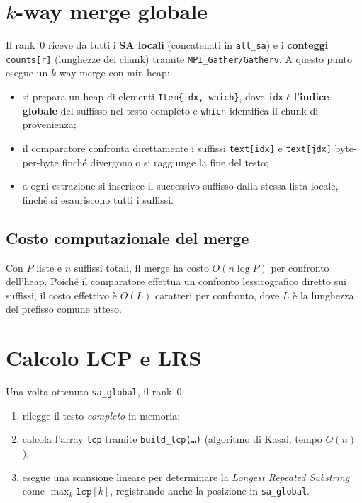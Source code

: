 	\section{$k$-way merge globale}
		Il rank~0 riceve da tutti i \textbf{SA locali} (concatenati in \texttt{all\_sa}) e i \textbf{conteggi} \texttt{counts[r]} (lunghezze dei chunk) tramite \texttt{MPI\_Gather/Gatherv}.
		A questo punto esegue un $k$-way merge con min-heap:
		\begin{itemize}
			\item si prepara un heap di elementi \texttt{Item\{idx, which\}}, dove \texttt{idx} è l'\textbf{indice globale} del suffisso nel testo completo e \texttt{which} identifica il chunk di provenienza;
			\item il comparatore confronta direttamente i suffissi \texttt{text[idx]} e \texttt{text[jdx]} byte-per-byte finché divergono o si raggiunge la fine del testo;
			\item a ogni estrazione si inserisce il successivo suffisso dalla stessa lista locale, finché si esauriscono tutti i suffissi.
		\end{itemize}
		
		\subsection*{Costo computazionale del merge}
			Con $P$ liste e $n$ suffissi totali, il merge ha costo $O(n \log P)$ per confronto dell'heap.
			Poiché il comparatore effettua un confronto lessicografico diretto sui suffissi, il costo effettivo è $O(L)$ caratteri per confronto, dove $L$ è la lunghezza del prefisso comune atteso.
	
	\section{Calcolo LCP e LRS}
		Una volta ottenuto \texttt{sa\_global}, il rank~0:
		\begin{enumerate}
			\item rilegge il testo \emph{completo} in memoria;
			\item calcola l'array \texttt{lcp} tramite \texttt{build\_lcp(\dots)} (algoritmo di Kasai, tempo $O(n)$);
			\item esegue una scansione lineare per determinare la \textit{Longest Repeated Substring} come $\max_k \texttt{lcp}[k]$, registrando anche la posizione in \texttt{sa\_global}.
		\end{enumerate}
		
